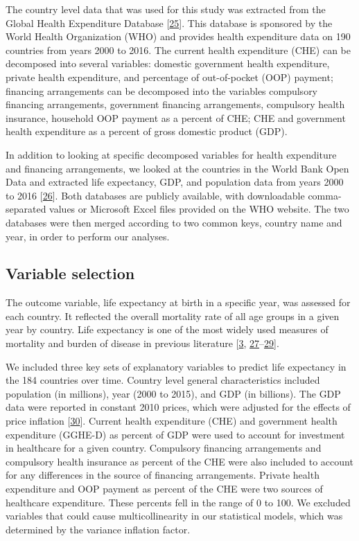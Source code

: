 \documentclass[]{elsarticle} %
\begin{document}
The country level data that was used for this study was extracted from the Global Health Expenditure Database {[}\protect\hyperlink{ref-WHOdata}{25}{]}.
This database is sponsored by the World Health Organization (WHO) and provides health expenditure data on 190 countries from years 2000 to 2016.
The current health expenditure (CHE) can be decomposed into several variables: domestic government health expenditure, private health expenditure, and percentage of out-of-pocket (OOP) payment;
financing arrangements can be decomposed into the variables compulsory financing arrangements, government financing arrangements, compulsory health insurance, household OOP payment as a percent of CHE;
CHE and government health expenditure as a percent of gross domestic product (GDP).

In addition to looking at specific decomposed variables for health expenditure and financing arrangements, we looked at the countries in the World Bank Open Data and extracted life expectancy, GDP, and population data from years 2000 to 2016 {[}\protect\hyperlink{ref-worldbank}{26}{]}.
Both databases are publicly available, with downloadable comma-separated values or Microsoft Excel files provided on the WHO website.
The two databases were then merged according to two common keys, country name and year, in order to perform our analyses.

\hypertarget{variable-selection}{%
\subsection{Variable selection}\label{variable-selection}}

The outcome variable, life expectancy at birth in a specific year, was assessed for each country.
It reflected the overall mortality rate of all age groups in a given year by country.
Life expectancy is one of the most widely used measures of mortality and burden of disease in previous literature {[}\protect\hyperlink{ref-mathers2015causes}{3}, \protect\hyperlink{ref-lee2012effect}{27}--\protect\hyperlink{ref-bennett2015future}{29}{]}.

We included three key sets of explanatory variables to predict life expectancy in the 184 countries over time.
Country level general characteristics included population (in millions), year (2000 to 2015), and GDP (in billions).
The GDP data were reported in constant 2010 prices, which were adjusted for the effects of price inflation {[}\protect\hyperlink{ref-worldbankconstant}{30}{]}.
Current health expenditure (CHE) and government health expenditure (GGHE-D) as percent of GDP were used to account for investment in healthcare for a given country.
Compulsory financing arrangements and compulsory health insurance as percent of the CHE were also included to account for any differences in the source of financing arrangements.
Private health expenditure and OOP payment as percent of the CHE were two sources of healthcare expenditure.
These percents fell in the range of 0 to 100. We excluded variables that could cause multicollinearity in our statistical models, which was determined by the variance inflation factor.
\end{document}
